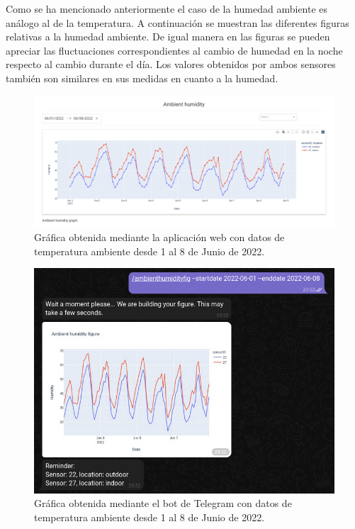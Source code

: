 \documentclass[a4paper, 12pt, oneside]{book}
\begin{document}
Como se ha mencionado anteriormente el caso de la humedad ambiente es análogo al de la temperatura. A continuación se muestran las diferentes figuras relativas a la humedad ambiente. De igual manera en las figuras se pueden apreciar las fluctuaciones correspondientes al cambio de humedad en la noche respecto al cambio durante el día. Los valores obtenidos por ambos sensores también son similares en sus medidas en cuanto a la humedad.
 
\begin{figure}[H]
	\centering
    \includegraphics[width=12cm, keepaspectratio]{img/ambient_humidity_01_08_junio}
    \caption{Gráfica obtenida mediante la aplicación web con datos de temperatura ambiente desde 1 al 8 de Junio de 2022.}
    \label{figura:ambient_humidity_01_08_junio}
\end{figure}
\begin{figure}[H]
	\centering
    \includegraphics[width=12cm, keepaspectratio]{img/telegram_ambient_humidity_01_08_junio}
    \caption{Gráfica obtenida mediante el bot de Telegram con datos de temperatura ambiente desde 1 al 8 de Junio de 2022.}
    \label{figura:telegram_ambient_humidity_01_08_junio}
\end{figure}
\end{document}
